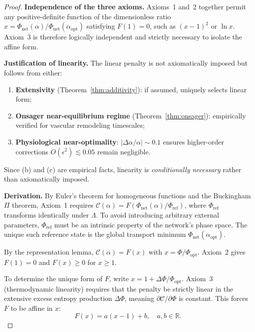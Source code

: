 \begin{proof}
\textbf{Independence of the three axioms.} Axioms~1 and~2 together permit any
positive-definite function of the dimensionless ratio $x =
\Phi_{\mathrm{net}}(\alpha)/\Phi_{\mathrm{net}}(\alpha_{\mathrm{opt}})$
satisfying $F(1)=0$, such as $(x-1)^2$ or $\ln x$. Axiom~3 is therefore
logically independent and strictly necessary to isolate the affine form.

\textbf{Justification of linearity.} The linear penalty is not axiomatically
imposed but follows from either:
\begin{enumerate}[label=(\alph*)]
    \item
\textbf{Extensivity} (Theorem~\ref{thm:additivity}): if assumed, uniquely
selects linear form;
    \item
\textbf{Onsager near-equilibrium regime} (Theorem~\ref{thm:onsager}):
empirically verified for vascular remodeling timescales;
    \item
\textbf{Physiological near-optimality}: $|\Delta\alpha/\alpha| \sim 0.1$ ensures
higher-order corrections $O(\epsilon^2) \lesssim 0.05$ remain negligible.
\end{enumerate}
Since (b) and (c) are empirical facts, linearity is \emph{conditionally
necessary} rather than axiomatically imposed.

\textbf{Derivation.} By Euler's theorem for homogeneous functions and the
Buckingham $\Pi$ theorem, Axiom~1 requires $\mathcal{C}(\alpha) =
F(\Phi_{\mathrm{net}}(\alpha)/\Phi_{\mathrm{ref}})$, where $\Phi_{\mathrm{ref}}$
transforms identically under $\Lambda$. To avoid introducing arbitrary external
parameters, $\Phi_{\mathrm{ref}}$ must be an intrinsic property of the network's
phase space. The unique such reference state is the global transport minimum
$\Phi_{\mathrm{net}}(\alpha_{\mathrm{opt}})$.

By the representation lemma, $\mathcal{C}(\alpha) = F(x)$ with $x =
\Phi/\Phi_{\mathrm{opt}}$. Axiom~2 gives $F(1) = 0$ and $F(x) \ge 0$ for $x \ge
1$.

To determine the unique form of $F$, write $x = 1 +
\Delta\Phi/\Phi_{\mathrm{opt}}$. Axiom~3 (thermodynamic linearity) requires that
the penalty be strictly linear in the extensive excess entropy production
$\Delta\Phi$, meaning $\partial\mathcal{C}/\partial\Phi$ is constant. This
forces $F$ to be affine in $x$:
\begin{equation}
    F(x) = a(x - 1) + b, \quad a, b \in \mathbb{R}.
\end{equation}


\end{proof}
